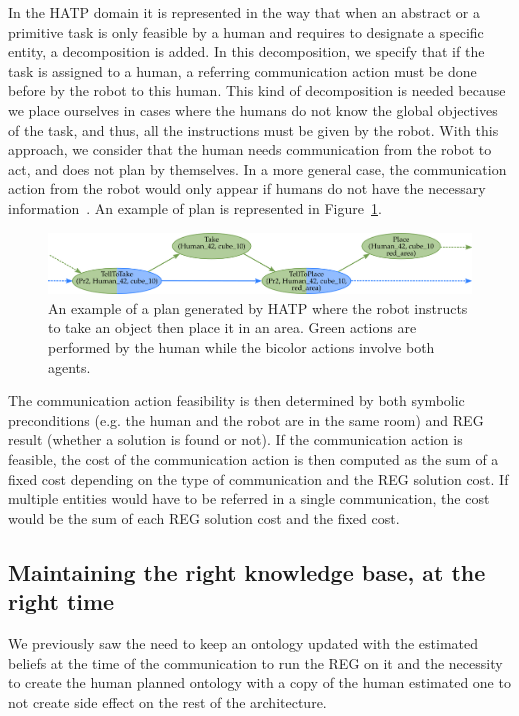 In the HATP domain it is represented in the way that when an abstract or a primitive task is only feasible by a human and requires to designate a specific entity, a decomposition is added. In this decomposition, we specify that if the task is assigned to a human, a referring communication action must be done before by the robot to this human. This kind of decomposition is needed because we place ourselves in cases where the humans do not know the global objectives of the task, and thus, all the instructions must be given by the robot. With this approach, we consider that the human needs communication from the robot to act, and does not plan by themselves. In a more general case, the communication action from the robot would only appear if humans do not have the necessary information~\cite{devin_2016_implemented}. An example of plan is represented in Figure~\ref{fig:chap5_plan}.

\begin{figure}[!ht]
\centering
\includegraphics[width=\textwidth]{figures/chapter5/plan.png}
\caption{\label{fig:chap5_plan} An example of a plan generated by HATP where the robot instructs to take an object then place it in an area. Green actions are performed by the human while the bicolor actions involve both agents. }
\end{figure}

The communication action feasibility is then determined by both symbolic preconditions (e.g. the human and the robot are in the same room) and REG result (whether a solution is found or not). If the communication action is feasible, the cost of the communication action is then computed as the sum of a fixed cost depending on the type of communication and the REG solution cost. If multiple entities would have to be referred in a single communication, the cost would be the sum of each REG solution cost and the fixed cost.

\subsection{Maintaining the right knowledge base, at the right time}

We previously saw the need to keep an ontology updated with the estimated beliefs at the time of the communication to run the REG on it and the necessity to create the human planned ontology with a copy of the human estimated one to not create side effect on the rest of the architecture.


